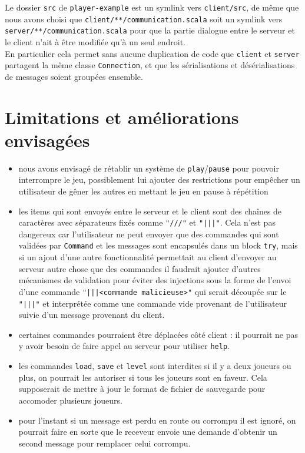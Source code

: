 \documentclass[a4paper,french]{article}
\newcommand{\ttt}[1]{\texttt{#1}}
\begin{document}
Le dossier \ttt{src} de \ttt{player-example} est un symlink vers \ttt{client/src}, de même que nous avons choisi
que \ttt{client/**/communication.scala} soit un symlink vers \ttt{server/**/communication.scala} pour que la partie
dialogue entre le serveur et le client n'ait à être modifiée qu'à un seul endroit.\\
En particulier cela permet sans aucune duplication de code que \ttt{client} et \ttt{server} partagent la même classe
\ttt{Connection}, et que les sérialisations et désérialisations de messages soient groupées ensemble.


\section{Limitations et améliorations envisagées}

\begin{itemize}
    \item nous avons envisagé de rétablir un système de \ttt{play}/\ttt{pause} pour pouvoir interrompre le jeu,
        possiblement lui ajouter des restrictions pour empêcher un utilisateur de gêner les autres en mettant le
        jeu en pause à répétition
    \item les items qui sont envoyés entre le serveur et le client sont des cha\^ines de caractères avec séparateurs
        fixés comme \ttt{"///"} et \ttt{"|||"}. Cela n'est pas dangereux car l'utilisateur ne peut envoyer
        que des commandes qui sont validées par \ttt{Command} et les messages sont encapsulés dans un block \ttt{try},
        mais si un ajout d'une autre fonctionnalité permettait au client d'envoyer au serveur autre chose que des commandes
        il faudrait ajouter d'autres mécanismes de validation pour éviter des injections sous la forme de l'envoi
        d'une commande \ttt{"|||<commande malicieuse>"} qui serait découpée sur le \ttt{"|||"} et interprétée
        comme une commande vide provenant de l'utilisateur suivie d'un message provenant du client.
    \item certaines commandes pourraient être déplacées côté client : il pourrait ne pas y avoir besoin de faire
        appel au serveur pour utiliser \ttt{help}.
    \item les commandes \ttt{load}, \ttt{save} et \ttt{level} sont interdites si il y a deux joueurs ou plus, on pourrait les
        autoriser si tous les joueurs sont en faveur. Cela supposerait de mettre à jour le format de fichier de sauvegarde
        pour accomoder plusieurs joueurs.
    \item pour l'instant si un message est perdu en route ou corrompu il est ignor\'e, on pourrait faire en sorte
        que le receveur envoie une demande d'obtenir un second message pour remplacer celui corrompu.
\end{itemize}
\end{document}
